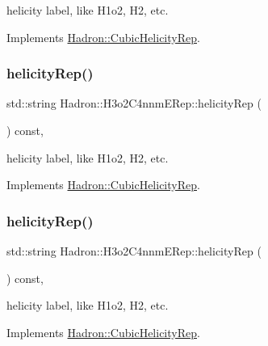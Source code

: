 helicity label, like H1o2, H2, etc. 

Implements \mbox{\hyperlink{structHadron_1_1CubicHelicityRep_af1096946b7470edf0a55451cc662f231}{Hadron\+::\+Cubic\+Helicity\+Rep}}.

\mbox{\label{structHadron_1_1H3o2C4nnmERep_a4ca04daa91fc608d0c528d0e0eb6a24e}} 
\subsubsection{\texorpdfstring{helicityRep()}{helicityRep()}\hspace{0.1cm}{\footnotesize\ttfamily [2/3]}}
{\footnotesize\ttfamily std\+::string Hadron\+::\+H3o2\+C4nnm\+E\+Rep\+::helicity\+Rep (\begin{DoxyParamCaption}{ }\end{DoxyParamCaption}) const\hspace{0.3cm}{\ttfamily [inline]}, {\ttfamily [virtual]}}

helicity label, like H1o2, H2, etc. 

Implements \mbox{\hyperlink{structHadron_1_1CubicHelicityRep_af1096946b7470edf0a55451cc662f231}{Hadron\+::\+Cubic\+Helicity\+Rep}}.

\mbox{\label{structHadron_1_1H3o2C4nnmERep_a4ca04daa91fc608d0c528d0e0eb6a24e}} 
\subsubsection{\texorpdfstring{helicityRep()}{helicityRep()}\hspace{0.1cm}{\footnotesize\ttfamily [3/3]}}
{\footnotesize\ttfamily std\+::string Hadron\+::\+H3o2\+C4nnm\+E\+Rep\+::helicity\+Rep (\begin{DoxyParamCaption}{ }\end{DoxyParamCaption}) const\hspace{0.3cm}{\ttfamily [inline]}, {\ttfamily [virtual]}}

helicity label, like H1o2, H2, etc. 

Implements \mbox{\hyperlink{structHadron_1_1CubicHelicityRep_af1096946b7470edf0a55451cc662f231}{Hadron\+::\+Cubic\+Helicity\+Rep}}.

